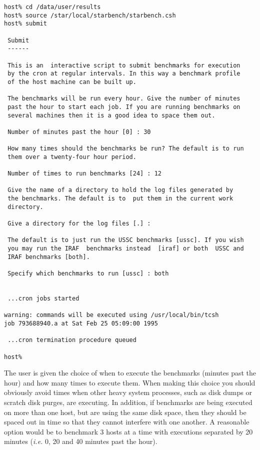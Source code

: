 \begin{enumerate}
\begin{verbatim}
host% cd /data/user/results
host% source /star/local/starbench/starbench.csh
host% submit

 Submit
 ------

 This is an  interactive script to submit benchmarks for execution
 by the cron at regular intervals. In this way a benchmark profile
 of the host machine can be built up.

 The benchmarks will be run every hour. Give the number of minutes
 past the hour to start each job. If you are running benchmarks on
 several machines then it is a good idea to space them out.       

 Number of minutes past the hour [0] : 30

 How many times should the benchmarks be run? The default is to run
 them over a twenty-four hour period.

 Number of times to run benchmarks [24] : 12

 Give the name of a directory to hold the log files generated by
 the benchmarks. The default is to  put them in the current work
 directory.

 Give a directory for the log files [.] : 

 The default is to just run the USSC benchmarks [ussc]. If you wish
 you may run the IRAF  benchmarks instead  [iraf] or both  USSC and
 IRAF benchmarks [both].

 Specify which benchmarks to run [ussc] : both


 ...cron jobs started

warning: commands will be executed using /usr/local/bin/tcsh
job 793688940.a at Sat Feb 25 05:09:00 1995

 ...cron termination procedure queued

host%
\end{verbatim} 

The user is given the choice of when to execute the benchmarks (minutes
past the hour) and how many times to execute them. When making this
choice you should obviously avoid times when other heavy system
processes, such as disk dumps or scratch disk purges, are executing. In
addition, if benchmarks are being executed on more than one host, but
are using the same disk space, then they should be spaced out in time
so that they cannot interfere with one another. A reasonable option
would be to benchmark 3 hosts at a time with executions separated by 20
minutes ({\em i.e.} 0, 20 and 40 minutes past the hour).


\end{enumerate}
